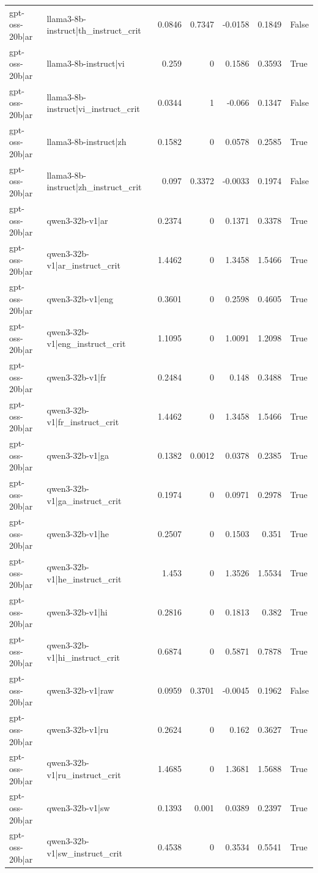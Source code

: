 \begin{table}
\begin{tabular}{l l r r r r l}
gpt-oss-20b|ar & llama3-8b-instruct|th_instruct_crit & 0.0846 & 0.7347 & -0.0158 & 0.1849 & False \\
gpt-oss-20b|ar & llama3-8b-instruct|vi & 0.259 & 0 & 0.1586 & 0.3593 & True \\
gpt-oss-20b|ar & llama3-8b-instruct|vi_instruct_crit & 0.0344 & 1 & -0.066 & 0.1347 & False \\
gpt-oss-20b|ar & llama3-8b-instruct|zh & 0.1582 & 0 & 0.0578 & 0.2585 & True \\
gpt-oss-20b|ar & llama3-8b-instruct|zh_instruct_crit & 0.097 & 0.3372 & -0.0033 & 0.1974 & False \\
gpt-oss-20b|ar & qwen3-32b-v1|ar & 0.2374 & 0 & 0.1371 & 0.3378 & True \\
gpt-oss-20b|ar & qwen3-32b-v1|ar_instruct_crit & 1.4462 & 0 & 1.3458 & 1.5466 & True \\
gpt-oss-20b|ar & qwen3-32b-v1|eng & 0.3601 & 0 & 0.2598 & 0.4605 & True \\
gpt-oss-20b|ar & qwen3-32b-v1|eng_instruct_crit & 1.1095 & 0 & 1.0091 & 1.2098 & True \\
gpt-oss-20b|ar & qwen3-32b-v1|fr & 0.2484 & 0 & 0.148 & 0.3488 & True \\
gpt-oss-20b|ar & qwen3-32b-v1|fr_instruct_crit & 1.4462 & 0 & 1.3458 & 1.5466 & True \\
gpt-oss-20b|ar & qwen3-32b-v1|ga & 0.1382 & 0.0012 & 0.0378 & 0.2385 & True \\
gpt-oss-20b|ar & qwen3-32b-v1|ga_instruct_crit & 0.1974 & 0 & 0.0971 & 0.2978 & True \\
gpt-oss-20b|ar & qwen3-32b-v1|he & 0.2507 & 0 & 0.1503 & 0.351 & True \\
gpt-oss-20b|ar & qwen3-32b-v1|he_instruct_crit & 1.453 & 0 & 1.3526 & 1.5534 & True \\
gpt-oss-20b|ar & qwen3-32b-v1|hi & 0.2816 & 0 & 0.1813 & 0.382 & True \\
gpt-oss-20b|ar & qwen3-32b-v1|hi_instruct_crit & 0.6874 & 0 & 0.5871 & 0.7878 & True \\
gpt-oss-20b|ar & qwen3-32b-v1|raw & 0.0959 & 0.3701 & -0.0045 & 0.1962 & False \\
gpt-oss-20b|ar & qwen3-32b-v1|ru & 0.2624 & 0 & 0.162 & 0.3627 & True \\
gpt-oss-20b|ar & qwen3-32b-v1|ru_instruct_crit & 1.4685 & 0 & 1.3681 & 1.5688 & True \\
gpt-oss-20b|ar & qwen3-32b-v1|sw & 0.1393 & 0.001 & 0.0389 & 0.2397 & True \\
gpt-oss-20b|ar & qwen3-32b-v1|sw_instruct_crit & 0.4538 & 0 & 0.3534 & 0.5541 & True \\

\end{tabular}
\end{table}
